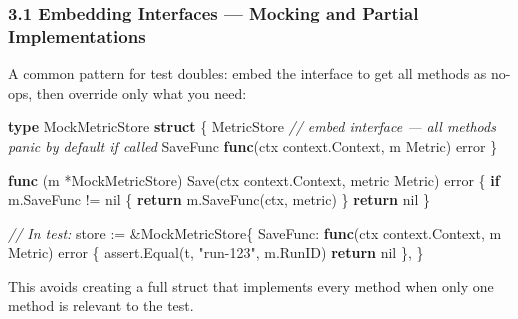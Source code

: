 \documentclass[
]{article}
\newenvironment{Shaded}{}{}
\newcommand{\CommentTok}[1]{\textcolor[rgb]{0.38,0.63,0.69}{\textit{#1}}}
\newcommand{\ControlFlowTok}[1]{\textcolor[rgb]{0.00,0.44,0.13}{\textbf{#1}}}
\newcommand{\DataTypeTok}[1]{\textcolor[rgb]{0.56,0.13,0.00}{#1}}
\newcommand{\KeywordTok}[1]{\textcolor[rgb]{0.00,0.44,0.13}{\textbf{#1}}}
\newcommand{\NormalTok}[1]{#1}
\newcommand{\OperatorTok}[1]{\textcolor[rgb]{0.40,0.40,0.40}{#1}}
\newcommand{\OtherTok}[1]{\textcolor[rgb]{0.00,0.44,0.13}{#1}}
\newcommand{\StringTok}[1]{\textcolor[rgb]{0.25,0.44,0.63}{#1}}
\begin{document}
\hypertarget{embedding-interfaces-mocking-and-partial-implementations}{%
\subsubsection{3.1 Embedding Interfaces --- Mocking and Partial
Implementations}\label{embedding-interfaces-mocking-and-partial-implementations}}

A common pattern for test doubles: embed the interface to get all
methods as no-ops, then override only what you need:

\begin{Shaded}
\begin{Highlighting}[]
\KeywordTok{type}\NormalTok{ MockMetricStore }\KeywordTok{struct} \OperatorTok{\{}
\NormalTok{    MetricStore }\CommentTok{// embed interface — all methods panic by default if called}
\NormalTok{    SaveFunc    }\KeywordTok{func}\OperatorTok{(}\NormalTok{ctx context}\OperatorTok{.}\NormalTok{Context}\OperatorTok{,}\NormalTok{ m Metric}\OperatorTok{)} \DataTypeTok{error}
\OperatorTok{\}}

\KeywordTok{func} \OperatorTok{(}\NormalTok{m }\OperatorTok{*}\NormalTok{MockMetricStore}\OperatorTok{)}\NormalTok{ Save}\OperatorTok{(}\NormalTok{ctx context}\OperatorTok{.}\NormalTok{Context}\OperatorTok{,}\NormalTok{ metric Metric}\OperatorTok{)} \DataTypeTok{error} \OperatorTok{\{}
    \ControlFlowTok{if}\NormalTok{ m}\OperatorTok{.}\NormalTok{SaveFunc }\OperatorTok{!=} \OtherTok{nil} \OperatorTok{\{}
        \ControlFlowTok{return}\NormalTok{ m}\OperatorTok{.}\NormalTok{SaveFunc}\OperatorTok{(}\NormalTok{ctx}\OperatorTok{,}\NormalTok{ metric}\OperatorTok{)}
    \OperatorTok{\}}
    \ControlFlowTok{return} \OtherTok{nil}
\OperatorTok{\}}

\CommentTok{// In test:}
\NormalTok{store }\OperatorTok{:=} \OperatorTok{\&}\NormalTok{MockMetricStore}\OperatorTok{\{}
\NormalTok{    SaveFunc}\OperatorTok{:} \KeywordTok{func}\OperatorTok{(}\NormalTok{ctx context}\OperatorTok{.}\NormalTok{Context}\OperatorTok{,}\NormalTok{ m Metric}\OperatorTok{)} \DataTypeTok{error} \OperatorTok{\{}
\NormalTok{        assert}\OperatorTok{.}\NormalTok{Equal}\OperatorTok{(}\NormalTok{t}\OperatorTok{,} \StringTok{"run{-}123"}\OperatorTok{,}\NormalTok{ m}\OperatorTok{.}\NormalTok{RunID}\OperatorTok{)}
        \ControlFlowTok{return} \OtherTok{nil}
    \OperatorTok{\},}
\OperatorTok{\}}
\end{Highlighting}
\end{Shaded}

This avoids creating a full struct that implements every method when
only one method is relevant to the test.
\end{document}
